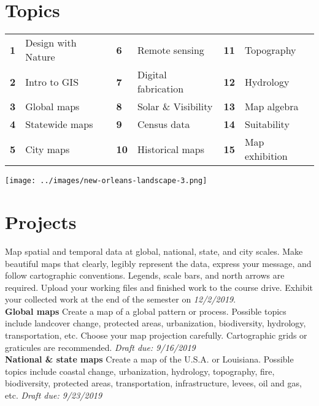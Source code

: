 \documentclass[11pt,article,oneside]{memoir}
\begin{document}
\section{Topics}
%
\begin{table}[H]
\begin{tabular}{l l @{\hskip 0.5cm} l l @{\hskip 0.5cm} l l}
\small
\textbf{1} & Design with Nature & \textbf{6} & Remote sensing & \textbf{11} & Topography\\
\textbf{2} & Intro to GIS & \textbf{7} & Digital fabrication & \textbf{12} & Hydrology\\
\textbf{3} & Global maps & \textbf{8} & Solar \& Visibility & \textbf{13} & Map algebra\\
\textbf{4} & Statewide maps & \textbf{9} & Census data & \textbf{14} & Suitability\\
\textbf{5} & City maps & \textbf{10} & Historical maps & \textbf{15} & Map exhibition\\
\end{tabular}
\end{table}

\vspace*{1em}

\texttt{[image: ../images/new-orleans-landscape-3.png]}

\clearpage

\section{Projects}
Map spatial and temporal data
at global, national, state, and city scales.
Make beautiful maps that 
clearly, legibly represent the data,
express your message, and
follow cartographic conventions.
Legends, scale bars, and north arrows are required.
Upload your working files and finished work to the course drive.
Exhibit your collected work at the end of the semester on
\emph{12/2/2019}.\\

\noindent \textbf{Global maps}
Create a map of a global pattern or process. 
Possible topics include landcover change, protected areas,
urbanization, biodiversity, hydrology, transportation, etc.
Choose your map projection carefully.
Cartographic grids or graticules are recommended.
\emph{Draft due: 9/16/2019}\\

\noindent \textbf{National \& state maps}
Create a map of the U.S.A. or Louisiana.
Possible topics include coastal change, urbanization, hydrology, topography, fire,
biodiversity, protected areas, transportation, infrastructure, levees, oil and gas, etc.
\emph{Draft due: 9/23/2019}\\
\end{document}
